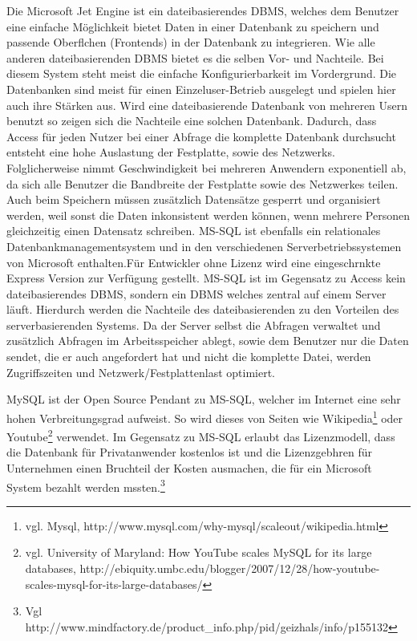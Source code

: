 Die Microsoft Jet Engine ist ein dateibasierendes DBMS, welches dem Benutzer eine einfache Möglichkeit bietet Daten in einer Datenbank zu speichern und passende Oberflchen (Frontends) in der Datenbank zu integrieren.
Wie alle anderen dateibasierenden DBMS bietet es die selben Vor- und Nachteile.
Bei diesem System steht meist die einfache Konfigurierbarkeit im Vordergrund. Die Datenbanken sind meist für einen Einzeluser-Betrieb ausgelegt und spielen hier auch ihre Stärken aus.
Wird eine dateibasierende Datenbank von mehreren Usern benutzt so zeigen sich die Nachteile eine solchen Datenbank.
Dadurch, dass Access für jeden Nutzer bei einer Abfrage die komplette Datenbank durchsucht entsteht eine hohe Auslastung der Festplatte, sowie des Netzwerks. Folglicherweise nimmt Geschwindigkeit bei mehreren Anwendern exponentiell ab, da sich alle Benutzer die Bandbreite der Festplatte sowie des Netzwerkes teilen.
Auch beim Speichern müssen zusätzlich Datensätze gesperrt und organisiert werden, weil sonst die Daten inkonsistent werden können, wenn mehrere Personen gleichzeitig einen Datensatz schreiben.
MS-SQL ist ebenfalls ein relationales Datenbankmanagementsystem und in den verschiedenen Serverbetriebssystemen von Microsoft enthalten.Für Entwickler ohne Lizenz wird eine eingeschrnkte Express Version zur Verfügung gestellt. MS-SQL ist im Gegensatz zu Access kein dateibasierendes DBMS, sondern ein DBMS welches zentral auf einem Server läuft.
Hierdurch werden die Nachteile des dateibasierenden zu den Vorteilen des serverbasierenden Systems.
Da der Server selbst die Abfragen verwaltet und zusätzlich Abfragen im Arbeitsspeicher ablegt, sowie dem Benutzer nur die Daten sendet, die er auch angefordert hat und nicht die komplette Datei, werden Zugriffszeiten und Netzwerk/Festplattenlast optimiert.

MySQL ist der Open Source Pendant zu MS-SQL, welcher im Internet eine sehr hohen Verbreitungsgrad aufweist.
So wird dieses von Seiten wie Wikipedia\footnote{vgl. Mysql, http://www.mysql.com/why-mysql/scaleout/wikipedia.html} oder
Youtube\footnote{vgl. University of Maryland: How YouTube scales MySQL for its large databases, http://ebiquity.umbc.edu/blogger/2007/12/28/how-youtube-scales-mysql-for-its-large-databases/} verwendet.
Im Gegensatz zu MS-SQL erlaubt das Lizenzmodell, dass die Datenbank für Privatanwender kostenlos ist und die Lizenzgebhren für Unternehmen einen Bruchteil der Kosten ausmachen, die für ein Microsoft System bezahlt werden mssten.\footnote{Vgl http://www.mindfactory.de/product\_info.php/pid/geizhals/info/p155132}


